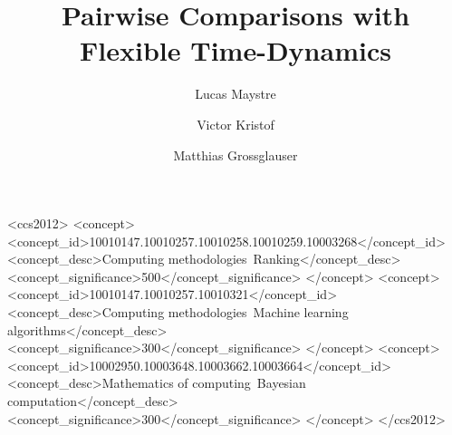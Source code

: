\documentclass[format=sigconf]{acmart}
\begin{document}
\title{Pairwise Comparisons with Flexible Time-Dynamics}

\author{Lucas Maystre}

\author{Victor Kristof}

\author{Matthias Grossglauser}

\renewcommand{\shortauthors}{L. Maystre et al.}

\begin{abstract}
% 
\end{abstract}

%
%
\begin{CCSXML}
<ccs2012>
<concept>
<concept_id>10010147.10010257.10010258.10010259.10003268</concept_id>
<concept_desc>Computing methodologies~Ranking</concept_desc>
<concept_significance>500</concept_significance>
</concept>
<concept>
<concept_id>10010147.10010257.10010321</concept_id>
<concept_desc>Computing methodologies~Machine learning algorithms</concept_desc>
<concept_significance>300</concept_significance>
</concept>
<concept>
<concept_id>10002950.10003648.10003662.10003664</concept_id>
<concept_desc>Mathematics of computing~Bayesian computation</concept_desc>
<concept_significance>300</concept_significance>
</concept>
</ccs2012>
\end{CCSXML}



\maketitle

% 
% 
% 
% 
% 
% 




% 
% 
\end{document}
